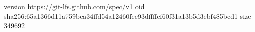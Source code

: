 version https://git-lfs.github.com/spec/v1
oid sha256:65a1366d11a759bca34ffd54a12460fee93dffffcf60f31a13b5d3ebf485bcd1
size 349692

